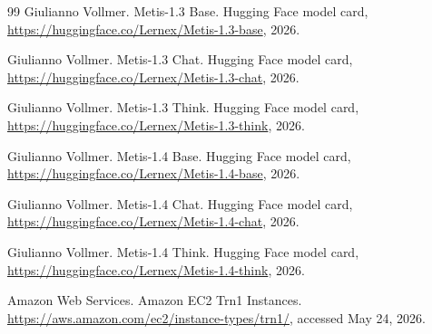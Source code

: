 \documentclass[11pt]{article}
\begin{document}
\begin{thebibliography}{99}
Giulianno Vollmer.
\newblock Metis-1.3 Base.
\newblock Hugging Face model card, \url{https://huggingface.co/Lernex/Metis-1.3-base}, 2026.

Giulianno Vollmer.
\newblock Metis-1.3 Chat.
\newblock Hugging Face model card, \url{https://huggingface.co/Lernex/Metis-1.3-chat}, 2026.

Giulianno Vollmer.
\newblock Metis-1.3 Think.
\newblock Hugging Face model card, \url{https://huggingface.co/Lernex/Metis-1.3-think}, 2026.

Giulianno Vollmer.
\newblock Metis-1.4 Base.
\newblock Hugging Face model card, \url{https://huggingface.co/Lernex/Metis-1.4-base}, 2026.

Giulianno Vollmer.
\newblock Metis-1.4 Chat.
\newblock Hugging Face model card, \url{https://huggingface.co/Lernex/Metis-1.4-chat}, 2026.

Giulianno Vollmer.
\newblock Metis-1.4 Think.
\newblock Hugging Face model card, \url{https://huggingface.co/Lernex/Metis-1.4-think}, 2026.

Amazon Web Services.
\newblock Amazon EC2 Trn1 Instances.
\newblock \url{https://aws.amazon.com/ec2/instance-types/trn1/}, accessed May 24, 2026.

\end{thebibliography}
\end{document}

